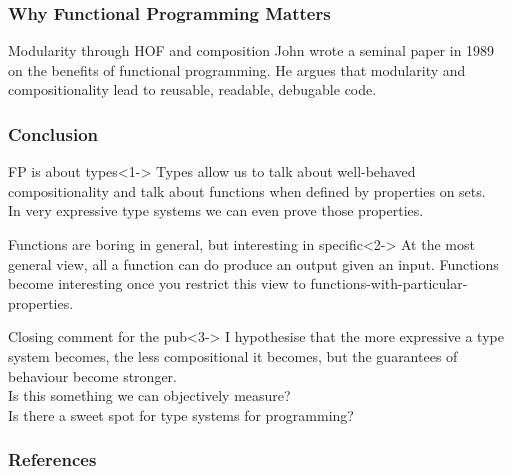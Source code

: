 \documentclass
  [hyperref={colorlinks = true,linkcolor = blue, 
             citecolor = blue, urlcolor = blue}
  ]{beamer}
\begin{document}
\begin{frame}[fragile]
  \frametitle{Why Functional Programming Matters
    \cite{hughes1989functional}}
  \begin{block}{Modularity through HOF and composition}
    John wrote a seminal paper in 1989 on the benefits of 
    functional programming. He argues that modularity and
    compositionality lead to reusable, readable, debugable
    code. 
  \end{block}

\end{frame}

\begin{frame}[fragile]
\frametitle{Conclusion}

  \begin{block}{FP is about types}<1->
    Types allow us to talk about well-behaved
    compositionality and talk about functions
    when defined by properties on sets. \\
    In very expressive type systems we can even
    prove those properties.
  \end{block}
  \begin{block}{Functions are boring in general, but
  interesting in specific}<2->
    At the most general view, all a function can do produce
    an output given an input. Functions become interesting
    once you restrict this view to
    functions-with-particular-properties.
  \end{block}
\begin{block}{Closing comment for the pub}<3->
  I hypothesise that the more expressive a type system
  becomes, the less compositional it becomes, but the
  guarantees of behaviour become stronger. \\
  Is this something we can objectively measure? \\
  Is there a sweet spot for type systems for programming?
\end{block}

\end{frame}

\begin{frame}[fragile]
\frametitle{References}
{}
\end{frame}
\end{document}

